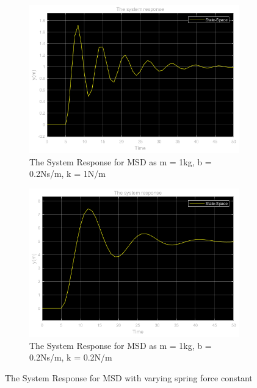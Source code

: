 \documentclass[a4paper,12pt]{article}
\begin{document}
\begin{enumerate}
\begin{enumerate}
\begin{enumerate}
				\begin{figure}[H]
					\setlength{\unitlength}{\textwidth} 
					\centering
					\begin{subfigure}{.5\textwidth}
  						\centering
  						\includegraphics[width=0.495\unitlength]{images/1cey}
  						\caption{\label{fig:1c1a} The System Response for MSD as m = 1kg, b = 0.2Ns/m, k = 1N/m }
					\end{subfigure}%
					\begin{subfigure}{.5\textwidth}
  						\centering
						\includegraphics[width=0.495\unitlength]{images/1c1ey}
  						\caption{\label{fig:1c1} The System Response for MSD as m = 1kg, b = 0.2Ns/m, k = 0.2N/m}
					\end{subfigure}
					\caption{\label{fig:varyingk} The System Response for MSD with varying spring force constant   }
				\end{figure}
				

\end{enumerate}
\end{enumerate}
\end{enumerate}
\end{document}
